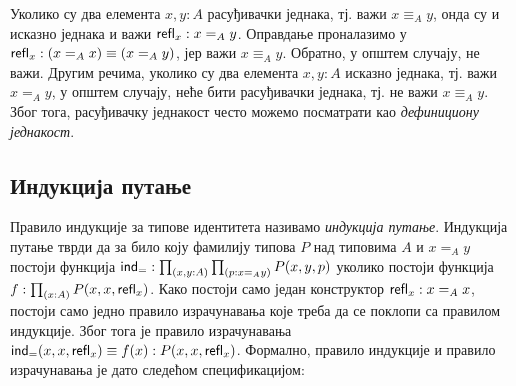\documentclass[12pt,oneside]{memoir}
\begin{document}
\begin{samepage}
    \begin{center}
        \begin{minipage}{0.49\textwidth}
            \begin{prooftree}[$=$-form]
            \end{prooftree}
        \end{minipage}
        \begin{minipage}{0.39\textwidth}
            \begin{prooftree}[$=$-intro]
            \end{prooftree}
        \end{minipage}
    \end{center}
\end{samepage}

Уколико су два елемента $x, y : A$ расуђивачки једнака, тј. важи $x \equiv_A y$, онда су и исказно једнака и важи $\refl{x} : x =_A y$. Оправдање проналазимо у $\refl{x} : (x =_A x) \equiv (x =_A y)$, јер важи $x \equiv_A y$. Обратно, у општем случају, не важи. Другим речима, уколико су два елемента $x, y : A$ исказно једнака, тј. важи $x =_A y$, у општем случају, неће бити расуђивачки једнака, тј. не важи $x \equiv_A y$. Због тога, расуђивачку једнакост често можемо посматрати као \emph{дефинициону једнакост}.

\subsection{Индукција путање}

Правило индукције за типове идентитета називамо \emph{индукција путање}. Индукција путање тврди да за било коју фамилију типова $P$ над типовима $A$ и $x =_A y$ постоји функција $\ind{=} : \prod_{(x, y : A)} \prod_{(p : x =_{A} y)} P(x, y, p)$ уколико постоји функција $f : \prod_{(x : A)} P(x, x, \refl{x})$. Како постоји само један конструктор $\refl{x} : x =_A x$, постоји само једно правило израчунавања које треба да се поклопи са правилом индукције. Због тога је правило израчунавања $\ind{=}(x, x, \refl{x}) \equiv f(x) : P(x, x, \refl{x})$. Формално, правило индукције и правило израчунавања је дато следећом спецификацијом:
\end{document}
